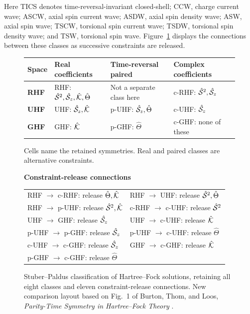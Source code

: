 \documentclass[11pt,a4paper,titlepage]{article}
\numberwithin{equation}{section}
\newcommand{\chK}{\Hat{\mathcal{K}}}
\newcommand{\chS}{\Hat{\mathcal{S}}}
\begin{document}
Here TICS denotes time-reversal-invariant closed-shell; CCW, charge current
wave; ASCW, axial spin current wave; ASDW, axial spin density wave; ASW,
axial spin wave; TSCW, torsional spin current wave; TSDW, torsional spin
density wave; and TSW, torsional spin wave.
Figure~\ref{fig:stuber-paldus} displays the connections between these classes
as successive constraints are released.

\begin{figure}[htbp]
  \centering

\begingroup
{\renewcommand{\arraystretch}{1.6}
\begin{tabularx}{\linewidth}{>{\bfseries}lXXX}
\toprule
Space & Real coefficients & Time-reversal paired & Complex coefficients\\
\midrule
\rowcolor{hfGreen!7}
RHF & RHF: $\chS^2,\chS_z,\chK,\hat\Theta$&
Not a separate class here&
c-RHF: $\chS^2,\chS_z$\\
\rowcolor{hfOrange!8}
UHF & UHF: $\chS_z,\chK$&
p-UHF: $\chS_z,\hat\Theta$&
c-UHF: $\chS_z$\\
\rowcolor{hfRed!6}
GHF & GHF: $\chK$&
p-GHF: $\hat\Theta$&
c-GHF: none of these\\
\bottomrule
\end{tabularx}}
\par\smallskip
{\small Cells name the retained symmetries. Real and paired classes are
alternative constraints.\par}
\par\medskip
{\small\bfseries\color{hfGreenDark}Constraint-release connections\par}\smallskip
{\small\renewcommand{\arraystretch}{1.35}
\begin{tabularx}{\linewidth}{XX}
RHF $\to$ c-RHF: release $\hat\Theta,\chK$&
RHF $\to$ UHF: release $\chS^2,\hat\Theta$\\
RHF $\to$ p-UHF: release $\chS^2,\chK$&
c-RHF $\to$ c-UHF: release $\chS^2$\\
UHF $\to$ GHF: release $\chS_z$&
UHF $\to$ c-UHF: release $\chK$\\
p-UHF $\to$ p-GHF: release $\chS_z$&
p-UHF $\to$ c-UHF: release $\hat\Theta$\\
c-UHF $\to$ c-GHF: release $\chS_z$&
GHF $\to$ c-GHF: release $\chK$\\
p-GHF $\to$ c-GHF: release $\hat\Theta$&
\end{tabularx}}
\endgroup


  \caption{Stuber--Paldus classification of Hartree--Fock
  solutions, retaining all eight classes and eleven constraint-release
  connections. New comparison layout based on Fig.~1 of Burton, Thom, and Loos,
  \emph{Parity-Time Symmetry in Hartree--Fock Theory}
  \citep{BurtonThomLoos2019}.}
  \label{fig:stuber-paldus}
\end{figure}
\end{document}

